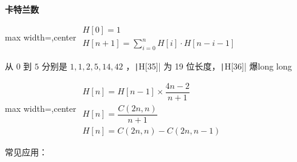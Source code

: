 \documentclass[twocolumn,10pt]{ctexart}
\makeatletter
\newcommand{\hfive}[1]{\par\addvspace{6pt}\@afterindentfalse
  {\noindent\bfseries\normalsize #1}\par\nobreak\vspace{2pt}}
\makeatother
\begin{document}
\hfive{卡特兰数}

\begin{adjustbox}{max width=\linewidth,center}
$\begin{gathered}
H[0]=1\\
H[n+1]=\sum_{i=0}^nH[i]\cdot H[n-i-1]
\end{gathered}$
\end{adjustbox}

从 $0$ 到 $5$ 分别是 $1,1,2,5,14,42$ ，\texttt|H[35]|  为 19 位长度，\texttt|H[36]| 爆long long

\begin{adjustbox}{max width=\linewidth,center}
$\begin{gathered}
H[n]=H[n-1]\times\dfrac{4n-2}{n+1}\\
H[n]=\dfrac{C(2n,n)}{n+1}\\
H[n]=C(2n,n)-C(2n,n-1)
\end{gathered}$
\end{adjustbox}

常见应用：
\end{document}
